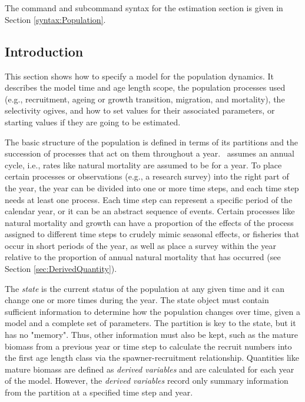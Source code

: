 \section{}\label{sec:Population}

The command and subcommand syntax for the estimation section is given in Section \ref{syntax:Population}.

\subsection{Introduction}

This section shows how to specify a model for the population dynamics. It describes the model time and \ifAgeBased age \else length \fi scope, the population processes used (e.g., recruitment, ageing or growth transition, migration, and mortality), the selectivity ogives, and how to set values for their associated parameters, or starting values if they are going to be estimated.

The basic structure of the population is defined in terms of its partitions and the succession of processes that act on them throughout a year. \CNAME\ assumes an annual cycle, i.e., rates like natural mortality are assumed to be for a year. To place certain processes or observations (e.g., a research survey) into the right part of the year, the year can be divided into one or more time steps, and each time step needs  at least one process. Each time step can represent a specific period of the calendar year, or it can be an abstract sequence of events. Certain processes like natural mortality and growth can have a proportion of the effects of the process assigned to different time steps to crudely mimic seasonal effects, or fisheries that occur in short periods of the year, as well as place a survey within the year relative to the proportion of annual natural mortality that has occurred (see Section \ref{sec:DerivedQuantity}).

The \emph{state} is the current status of the population at any given time and it can change one or more times during the year. The state object must contain sufficient information to determine how the population changes over time, given a model and a complete set of parameters. The partition is key to the state, but it has no "memory". Thus, other information must also be kept, such as the mature biomass from a previous year or time step to calculate the recruit numbers into the first \ifAgeBased age \else length \fi class via the spawner-recruitment relationship. Quantities like mature biomass are defined as \emph{derived variables} and are calculated for each year of the model. However, the \emph{derived variables} record only summary information from the partition at a specified time step and year.


